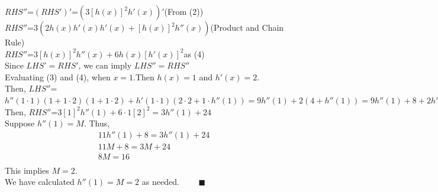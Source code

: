 \documentclass[12pt]{exam}
\newcommand {\DS} [1] {${\displaystyle #1}$}
\begin{document}
\begin{enumerate}[resume]
	\DS{RHS''}=\DS{(RHS')'}=$(3[h(x)]^2h'(x))'$\qquad(From (2))\\
	\DS{RHS''}=$3(2h(x)h'(x)h'(x)+[h(x)]^2h''(x))$\qquad(Product and Chain Rule)\\
	\DS{RHS''}=$3[h(x)]^2h''(x)+6h(x)[h'(x)]^2$\qquad as (4)\\
	Since $LHS'=RHS'$, we can imply $LHS''=RHS''$\\
	Evaluating (3) and (4), when $x=1$.Then $h(x)=1$ and $h'(x)=2$. \\
	Then, \DS{LHS''}=$h''(1\cdot1)(1+1\cdot2)(1+1\cdot2)+h'(1\cdot1)(2\cdot2+1\cdot h''(1))=9h''(1)+2(4+h''(1))=9h''(1)+8+2h''(1)=11h''(1)+8$\\
	Then, \DS{RHS''}=$3[1]^2h''(1)+6\cdot1[2]^2=3h''(1)+24$\\
	Suppose $h''(1)=M.$
	Thus,
	\begin{align*}
	    11h''(1)+8=3h''(1)+24\\
	    11M+8=3M+24\\
	    8M=16\\
	\end{align*}
	This implies $M=2.$\\
	We have calculated $h''(1)=M=2$ as needed. $\quad \quad \blacksquare$


\end{enumerate}
\end{document}
